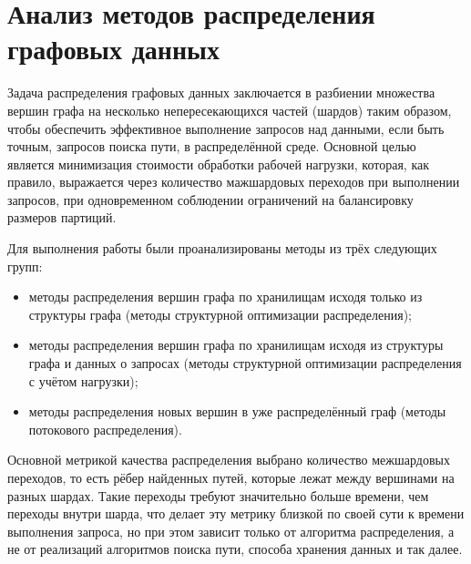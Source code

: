 \section{Анализ методов распределения графовых данных}

Задача распределения графовых данных заключается в разбиении множества вершин графа на несколько непересекающихся частей (шардов) таким образом, чтобы обеспечить эффективное выполнение запросов над данными, если быть точным, запросов поиска пути, в распределённой среде. Основной целью является минимизация стоимости обработки рабочей нагрузки, которая, как правило, выражается через количество мажшардовых переходов при выполнении запросов, при одновременном соблюдении ограничений на балансировку размеров партиций.

Для выполнения работы были проанализированы методы из трёх следующих групп:
\begin{itemize}
    \item методы распределения вершин графа по хранилищам исходя только из структуры графа (методы структурной оптимизации распределения);
    \item методы распределения вершин графа по хранилищам исходя из структуры графа и данных о запросах (методы структурной оптимизации распределения с учётом нагрузки);
    \item методы распределения новых вершин в уже распределённый граф (методы потокового распределения).
\end{itemize}

Основной метрикой качества распределения выбрано количество межшардовых переходов, то есть рёбер найденных путей, которые лежат между вершинами на разных шардах. Такие переходы требуют значительно больше времени, чем переходы внутри шарда, что делает эту метрику близкой по своей сути к времени выполнения запроса, но при этом зависит только от алгоритма распределения, а не от реализаций алгоритмов поиска пути, способа хранения данных и так далее.



